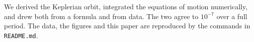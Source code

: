 We derived the Keplerian orbit, integrated the equations of motion
numerically, and drew both from a formula and from data.
The two agree to $10^{-7}$ over a full period.
The data, the figures and this paper are reproduced by the commands
in \texttt{README.md}.
